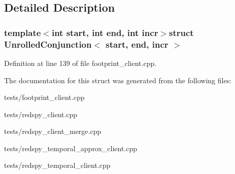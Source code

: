 \subsection{Detailed Description}
\subsubsection*{template$<$int start, int end, int incr$>$struct Unrolled\-Conjunction$<$ start, end, incr $>$}



Definition at line 139 of file footprint\-\_\-client.\-cpp.



The documentation for this struct was generated from the following files\-:\begin{DoxyCompactItemize}
\item 
tests/footprint\-\_\-client.\-cpp\item 
tests/redspy\-\_\-client.\-cpp\item 
tests/redspy\-\_\-client\-\_\-merge.\-cpp\item 
tests/redspy\-\_\-temporal\-\_\-approx\-\_\-client.\-cpp\item 
tests/redspy\-\_\-temporal\-\_\-client.\-cpp\end{DoxyCompactItemize}
